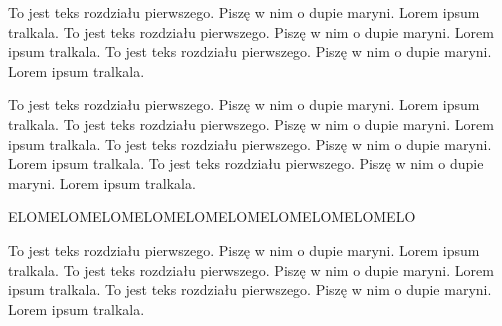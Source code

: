 \documentclass[../main.tex]{subfiles}
\begin{document}
To jest teks rozdziału pierwszego. Piszę w nim o dupie maryni.
Lorem ipsum tralkala. To jest teks rozdziału pierwszego. Piszę w nim o dupie maryni.
Lorem ipsum tralkala. To jest teks rozdziału pierwszego. Piszę w nim o dupie maryni.
Lorem ipsum tralkala. 



To jest teks rozdziału pierwszego. Piszę w nim o dupie maryni.
Lorem ipsum tralkala. To jest teks rozdziału pierwszego. Piszę w nim o dupie maryni.
Lorem ipsum tralkala. 
To jest teks rozdziału pierwszego. Piszę w nim o dupie maryni.
Lorem ipsum tralkala. To jest teks rozdziału pierwszego. Piszę w nim o dupie maryni.
Lorem ipsum tralkala.  

ELOMELOMELOMELOMELOMELOMELOMELOMELOMELO


To jest teks rozdziału pierwszego. Piszę w nim o dupie maryni.
Lorem ipsum tralkala. To jest teks rozdziału pierwszego. Piszę w nim o dupie maryni.
Lorem ipsum tralkala. To jest teks rozdziału pierwszego. Piszę w nim o dupie maryni.
Lorem ipsum tralkala. 
\end{document}
